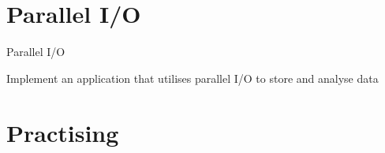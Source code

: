 \documentclass[compress,11pt,xcolor=svgnames,aspectratio=169]{beamer}
\begin{document}

\section{Parallel I/O}

\begin{frame}[fragile]{Parallel I/O}

Implement an application that utilises parallel I/O to store and analyse data

\end{frame}

\section{Practising}
\end{document}
